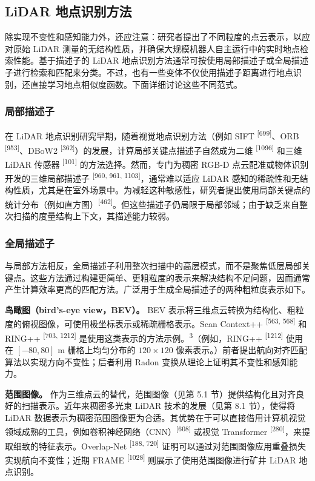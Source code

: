 \subsection{LiDAR 地点识别方法}

除实现不变性和感知能力外，还应注意：研究者提出了不同粒度的点云表示，以应对原始 LiDAR 测量的无结构性质，并确保大规模机器人自主运行中的实时地点检索性能。基于描述子的 LiDAR 地点识别方法通常可按使用局部描述子或全局描述子进行检索和匹配来分类。不过，也有一些变体不仅使用描述子距离进行地点识别，还直接学习地点相似度函数。下面详细讨论这些不同范式。

\subsubsection{局部描述子}

在 LiDAR 地点识别研究早期，随着视觉地点识别方法（例如 SIFT \textsuperscript{[699]}、ORB \textsuperscript{[953]}、DBoW2 \textsuperscript{[362]}）的发展，计算局部关键点描述子自然成为二维 \textsuperscript{[1096]} 和三维 LiDAR 传感器 \textsuperscript{[101]} 的方法选择。然而，专门为稠密 RGB-D 点云配准或物体识别开发的三维局部描述子 \textsuperscript{[960, 961, 1103]}，通常难以适应 LiDAR 感知的稀疏性和无结构性质，尤其是在室外场景中。为减轻这种敏感性，研究者提出使用局部关键点的统计分布（例如直方图）\textsuperscript{[462]}。但这些描述子仍局限于局部邻域；由于缺乏来自整次扫描的度量结构上下文，其描述能力较弱。

\subsubsection{全局描述子}

与局部方法相反，全局描述子利用整次扫描中的高层模式，而不是聚焦低层局部关键点。这些方法通过构建更简单、更粗粒度的表示来解决结构不足问题，因而通常产生计算效率更高的匹配方法。广泛用于生成全局描述子的两种粗粒度表示如下。

\textbf{鸟瞰图（bird's-eye view，BEV）。} BEV 表示将三维点云转换为结构化、粗粒度的俯视图像，可使用极坐标表示或稀疏栅格表示。Scan Context++ \textsuperscript{[563, 568]} 和 RING++ \textsuperscript{[703, 1212]} 是使用这类表示的方法示例。\textsuperscript{3}（例如，RING++ \textsuperscript{[1212]} 使用在 $[-80,80]$ m 栅格上均匀分布的 $120 \times 120$ 像素表示。）前者提出航向对齐匹配算法以实现方向不变性；后者利用 Radon 变换从理论上证明其不变性和感知能力。

\textbf{范围图像。} 作为三维点云的替代，范围图像（见第 5.1 节）提供结构化且对齐良好的扫描表示。近年来稠密多光束 LiDAR 技术的发展（见第 8.1 节），使得将 LiDAR 数据表示为稠密范围图像更为合适。其优势在于可以直接借用计算机视觉领域成熟的工具，例如卷积神经网络（CNN）\textsuperscript{[608]} 或视觉 Transformer \textsuperscript{[280]}，来提取细致的特征表示。Overlap-Net \textsuperscript{[188, 720]} 证明可以通过对范围图像应用重叠损失实现航向不变性；近期 FRAME \textsuperscript{[1028]} 则展示了使用范围图像进行矿井 LiDAR 地点识别。

